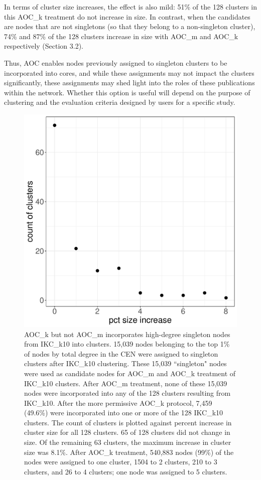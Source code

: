 \documentclass[12pt, oneside]{article}   	%
\begin{document}
In terms of cluster size increases, the effect is also mild: 51\% of the 128 clusters in this AOC\_k treatment do not increase in size. In contrast, when the candidates are nodes that are not singletons (so that they belong to a non-singleton cluster), 74\% and 87\% of the 128 clusters increase in size with AOC\_m and AOC\_k respectively  (Section 3.2).  

Thus, AOC enables nodes previously assigned to singleton clusters to  be incorporated into cores, and while these assignments may not impact the clusters significantly, these assignments may shed light into the roles of these publications within the network.  Whether this option is useful will depend on the purpose of clustering and the evaluation criteria designed by users for a specific study.

\begin{figure}
\centering
\includegraphics[width=0.6\linewidth]{bl_singletons.pdf} 
\captionsetup{width=0.9\textwidth}
\caption{AOC\_k but not AOC\_m incorporates high-degree singleton nodes from IKC\_k10 into clusters. 15,039 nodes belonging to the top  1\% of nodes by total degree in the CEN were assigned to singleton clusters after IKC\_k10 clustering. These 15,039  ``singleton" nodes were used as candidate nodes for AOC\_m and AOC\_k treatment of IKC\_k10 clusters. After AOC\_m treatment, none of these 15,039 nodes were incorporated into any of the 128 clusters resulting from  IKC\_k10. After the more permissive AOC\_k protocol, 7,459 (49.6\%) were incorporated into one or more of the 128 IKC\_k10 clusters. The count of clusters is plotted against percent increase in cluster size for all 128 clusters. 65 of 128 clusters did not change in size. Of the remaining 63 clusters, the maximum increase in cluster size was 8.1\%.  After AOC\_k treatment, 540,883 nodes (99\%) of the nodes were assigned to one cluster, 1504 to 2 clusters, 210 to 3 clusters, and 26 to 4 clusters; one node was assigned to 5 clusters.
\label{fig:singleton}}
\end{figure}
	
\end{document}
